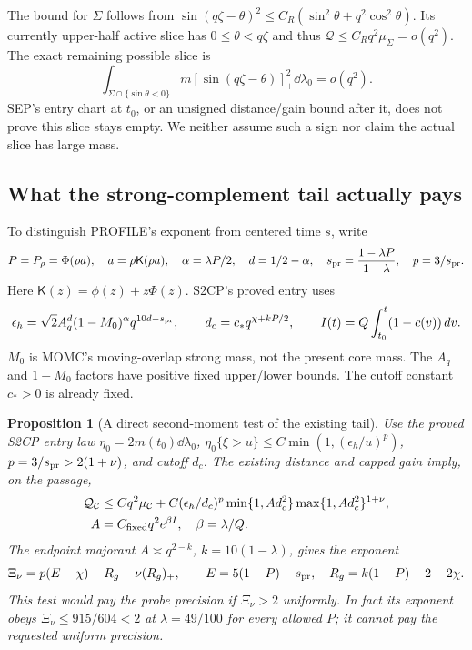 \documentclass[11pt]{article}
\numberwithin{equation}{section}
\newtheorem{proposition}[theorem]{Proposition}
\theoremstyle{remark}\newtheorem{remark}[theorem]{Remark}
\newcommand{\Kfun}{\mathsf K}\newcommand{\Ffun}{\mathsf F}
\begin{document}
The bound for \(\Sigma\) follows from
\(\sin(q\zeta-\theta)^2\le
C_R(\sin^2\theta+q^2\cos^2\theta)\).
Its currently upper-half active slice has \(0\le\theta<q\zeta\)
and thus \(\mathcal Q\le C_Rq^2\mu_\Sigma=o(q^2)\).
The exact remaining possible slice is
\begin{equation}
 \int_{\Sigma\cap\{\sin\theta<0\}}
       m[\sin(q\zeta-\theta)]_+^2\dd\lambda_0=o(q^2).
 \label{an07cwiv1:Sigmagap}
\end{equation}
SEP's entry chart at \(t_0\), or an unsigned distance/gain bound
after it, does not prove this slice stays empty. We neither
assume such a sign nor claim the actual slice has large mass.

\subsection{What the strong-complement tail actually pays}
To distinguish PROFILE's exponent from centered time \(s\), write
\[
 P=P_\rho=\Phi(\rho a),\quad a=\rho\Kfun(\rho a),\quad
 \alpha=\lambda P/2,\quad d=1/2-\alpha,\quad
 s_{\rm pr}=\frac{1-\lambda P}{1-\lambda},\quad p=3/s_{\rm pr}.
 \]
Here \(\Kfun(z)=\phi(z)+z\Phi(z)\).
S2CP's proved entry uses
\[
 \epsilon_h=\sqrt2 A_q^d(1-M_0)^\alpha
                  q^{10d-s_{\rm pr}},\qquad
 d_c=c_*q^{\chi+kP/2},\qquad
 I(t)=Q\int_{t_0}^t(1-c(v))\,d v.
 \]
\(M_0\) is MOMC's moving-overlap strong mass, not the present
core mass. The \(A_q\) and \(1-M_0\) factors have positive fixed
upper/lower bounds. The cutoff constant \(c_*>0\) is already fixed.
\begin{proposition}[A direct second-moment test of the existing tail]
\label{an07cwiv1:tailtest}
Use the proved S2CP entry law \(\eta_0=2m(t_0)\dd\lambda_0\),
\(\eta_0\{\xi>u\}\le C\min(1,(\epsilon_h/u)^p)\),
\(p=3/s_{\rm pr}>2(1+\nu)\), and cutoff \(d_c\).
The existing distance and capped gain imply, on the passage,
\begin{align}
 \mathcal Q_\mathcal C
 &\le Cq^2\mu_\mathcal C+
 C(\epsilon_h/d_c)^p
       \min\{1,Ad_c^2\}\max\{1,Ad_c^2\}^{1+\nu},
 \label{an07cwiv1:tailbound}\\
 A&=C_{\rm fixed}q^2 e^{\beta I},\quad \beta=\lambda/Q.
 \notag
\end{align}
The endpoint majorant \(A\asymp q^{2-k}\), \(k=10(1-\lambda)\),
gives the exponent
\begin{equation}
 \Xi_\nu=p(E-\chi)-R_g-\nu(R_g)_+,\qquad
 E=5(1-P)-s_{\rm pr},\quad R_g=k(1-P)-2-2\chi .
 \label{an07cwiv1:Xi}
\end{equation}
This test would pay the probe precision if \(\Xi_\nu>2\)
uniformly. In fact its exponent obeys \(\Xi_\nu\le915/604<2\)
at \(\lambda=49/100\) for every allowed \(P\); it cannot pay
the requested uniform precision.
\end{proposition}
\end{document}
